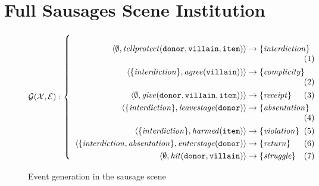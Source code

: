 \documentclass[11pt]{report}
\begin{document}
\chapter{Full Sausages Scene Institution}
\label{appendix:sausages-full}

\begin{figure}[!h]
\abovedisplayskip=0pt
\abovedisplayshortskip=0pt
$\mathcal{G(X, E)}:\left\{\mbox{%
{\begin{minipage}[c]{0.85\textwidth}
\begin{align}
\langle \emptyset,\mathit{tellprotect}\mathtt{(donor, villain, item)} \rangle%
& \rightarrow \left\{\mathit{interdiction}\right\}\label{eq:gfirst}\\
                      \langle \{\mathit{interdiction}\}, \mathit{agree}\mathtt{(villain)}) \rangle %
& \rightarrow \left\{\mathit{complicity}\right\}\\
                      \langle \emptyset, \mathit{give}\mathtt{(donor, villain, item)}) \rangle %
& \rightarrow \left\{\mathit{receipt}\right\}\label{eq:receipt}\\
                      \langle \{\mathit{interdiction}\}, \mathit{leavestage}(\mathtt{donor}) \rangle %
& \rightarrow \left\{\mathit{absentation}\right\}\label{eq:absentation}\\
                      \langle \{\mathit{interdiction}\}, \mathit{harmed}(\mathtt{item}) \rangle %
& \rightarrow \left\{\mathit{violation}\right\}\\
                      \langle \{\mathit{interdiction, absentation}\},
                      \mathit{enterstage}(\mathtt{donor}) \rangle %
& \rightarrow \left\{\mathit{return}\right\}\\
                      \langle \emptyset, \mathit{hit}(\mathtt{donor, villain}) \rangle %
& \rightarrow \left\{\mathit{struggle}\right\}\label{eq:glast}
\end{align}
\end{minipage}}}\right.$
\caption{Event generation in the sausage scene} \label{fig:gen-full}
\end{figure}
\end{document}
